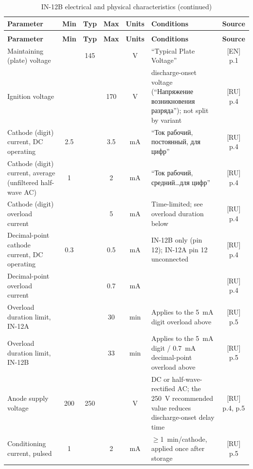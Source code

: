 {\footnotesize
\begin{longtable}{|L{3.6cm}|c|c|c|c|L{4.4cm}|c|}
\caption{IN-12B electrical and physical characteristics}\label{tab:in12b}\\
\hline
\textbf{Parameter} & \textbf{Min} & \textbf{Typ} & \textbf{Max} & \textbf{Units} & \textbf{Conditions} & \textbf{Source} \\
\hline
\endfirsthead
\caption[]{IN-12B electrical and physical characteristics (continued)}\\
\hline
\textbf{Parameter} & \textbf{Min} & \textbf{Typ} & \textbf{Max} & \textbf{Units} & \textbf{Conditions} & \textbf{Source} \\
\hline
\endhead
Maintaining (plate) voltage & & \num{145} & & \si{\volt} & ``Typical Plate Voltage'' & [EN] p.1 \\
\hline
Ignition voltage & & & \num{170} & \si{\volt} & discharge-onset voltage (``Напряжение возникновения разряда''); not split by variant & [RU] p.4 \\
\hline
Cathode (digit) current, DC operating & \num{2.5} & & \num{3.5} & \si{\milli\ampere} & ``Ток рабочий, постоянный, для цифр'' & [RU] p.4 \\
\hline
Cathode (digit) current, average (unfiltered half-wave AC) & \num{1} & & \num{2} & \si{\milli\ampere} & ``Ток рабочий, средний\ldots для цифр'' & [RU] p.4 \\
\hline
Cathode (digit) overload current & & & \num{5} & \si{\milli\ampere} & Time-limited; see overload duration below & [RU] p.4 \\
\hline
Decimal-point cathode current, DC operating & \num{0.3} & & \num{0.5} & \si{\milli\ampere} & IN-12B only (pin 12); IN-12A pin 12 unconnected & [RU] p.4 \\
\hline
Decimal-point overload current & & & \num{0.7} & \si{\milli\ampere} & & [RU] p.4 \\
\hline
Overload duration limit, IN-12A & & & \num{30} & min & Applies to the \SI{5}{\milli\ampere} digit overload above & [RU] p.5 \\
\hline
Overload duration limit, IN-12B & & & \num{33} & min & Applies to the \SI{5}{\milli\ampere} digit / \SI{0.7}{\milli\ampere} decimal-point overload above & [RU] p.5 \\
\hline
Anode supply voltage & \num{200} & \num{250} & & \si{\volt} & DC or half-wave-rectified AC; the \num{250}~V recommended value reduces discharge-onset delay time & [RU] p.4, p.5 \\
\hline
Conditioning current, pulsed & \num{1} & & \num{2} & \si{\milli\ampere} & $\geq$\SI{1}{\minute}/cathode, applied once after storage & [RU] p.5 \\

\end{longtable}}
